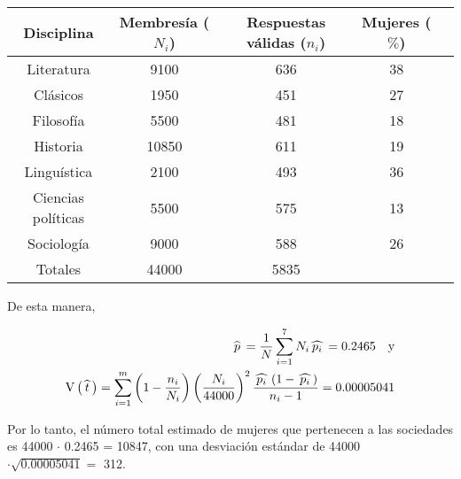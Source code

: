 \documentclass[12pt, fleqn]{article}
\newcommand{\gorro}[1]{\widehat{\hspace{0.7mm} #1 \hspace{0.7mm}}}
\newcommand{\V}[1]{\mathrm{V} \left( #1 \right)}
\begin{document}
    \begin{table}[h]
        \begin{tabular}{|c|c|c|c|c|}
            \hline
            Disciplina         & Membresía ($N_i$) & Respuestas válidas ($n_i$) & Mujeres ($\%$) \\
            \hline
            Literatura         & 9100      & 636                & 38 \\
            \hline
            Clásicos           & 1950      & 451                & 27 \\
            \hline
            Filosofía          & 5500      & 481                & 18 \\
            \hline
            Historia           & 10850     & 611                & 19 \\
            \hline
            Linguística        & 2100      & 493                & 36 \\
            \hline 
            Ciencias políticas & 5500      & 575                & 13  \\
            \hline
            Sociología         & 9000      & 588                & 26  \\
            \hline \hline
            Totales            & 44000     & 5835               & \\
            \hline
        \end{tabular}
    \end{table}

    De esta manera, 

    \begin{align*}
        \gorro{p} = \dfrac{1}{N} \sum_{i=1}^{7} N_i \gorro{p_i} = 0.2465 \quad \mbox{y} \\
        \V{\gorro{t}} = \sum_{i=1}^{m} \left( 1 - \dfrac{n_i}{N_i} \right) \left( \dfrac{N_i}{44000} \right)^2 \dfrac{\gorro{p_i} \left( 1 - \gorro{p_i} \right)}{n_i - 1} = 0.00005041
    \end{align*} 

    Por lo tanto, el número total estimado de mujeres que pertenecen a las sociedades es 44000 $\cdot$ 0.2465 = 10847, con una desviación estándar de 44000 $ \cdot \sqrt{0.00005041} = $ 312.
\end{document}
